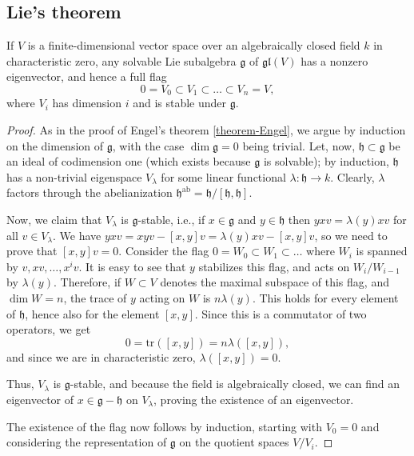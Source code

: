 \subsection{Lie's theorem}
\label{subsection-Lie-theorem}

\begin{theorem}
\label{theorem-Lie}
 If $V$ is a finite-dimensional vector space over an algebraically closed field $k$ in characteristic zero, any solvable Lie subalgebra $\mathfrak g$ of $\mathfrak{gl}(V)$ has a nonzero eigenvector, and hence a full flag
 $$ 0=V_0 \subset V_1 \subset \dots \subset V_n=V,$$
 where $V_i$ has dimension $i$ and is stable under $\mathfrak g$.
\end{theorem}

\begin{proof}
 As in the proof of Engel's theorem \ref{theorem-Engel}, we argue by induction on the dimension of $\mathfrak g$, with the case $\dim \mathfrak g=0$ being trivial. Let, now, $\mathfrak h\subset \mathfrak g$ be an ideal of codimension one (which exists because $\mathfrak g$ is solvable); by induction, $\mathfrak h$ has a non-trivial eigenspace $V_\lambda$ for some linear functional $\lambda: \mathfrak h \to k$. Clearly, $\lambda$ factors through the abelianization 
 $ \mathfrak h^{\text{ab}} = \mathfrak h/[\mathfrak h,\mathfrak h]$.
 
 Now, we claim that $V_\lambda$ is $\mathfrak g$-stable, i.e., if $x\in \mathfrak g$ and $y\in \mathfrak h$ then $yx v = \lambda(y) xv$ for all $v\in V_\lambda$. We have $yx v = xy v -[x,y]v = \lambda(y) xv - [x,y]v$, so we need to prove that $[x,y]v=0$. Consider the flag $0=W_0\subset W_1\subset \dots$ where $W_i$ is spanned by $v, xv, \dots, x^i v$. It is easy to see that $y$ stabilizes this flag, and acts on $W_i/W_{i-1}$ by $\lambda(y)$. Therefore, if $W\subset V$ denotes the maximal subspace of this flag, and $\dim W=n$, the trace of $y$ acting on $W$ is $n\lambda(y)$. This holds for every element of $\mathfrak h$, hence also for the element $[x,y]$. Since this is a commutator of two operators, we get
 $$ 0 = \text{tr}([x,y]) = n \lambda([x,y]),$$
 and since we are in characteristic zero, $\lambda([x,y]) = 0$. 
 
 Thus, $V_\lambda$ is $\mathfrak g$-stable, and because the field is algebraically closed, we can find an eigenvector of $x \in \mathfrak g - \mathfrak h$ on $V_\lambda$, proving the existence of an eigenvector.
 
 The existence of the flag now follows by induction, starting with $V_0=0$ and considering the representation of $\mathfrak g$ on the quotient spaces $V/V_i$.
\end{proof}


